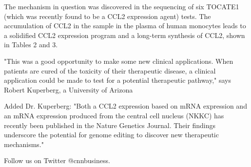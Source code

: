 \documentclass{article}
\begin{document}
The mechanism in question was discovered in the sequencing of six TOCATE1 (which was recently found to be a CCL2 expression agent) tests. The accumulation of CCL2 in the sample in the plasma of human monocytes leads to a solidified CCL2 expression program and a long-term synthesis of CCL2, shown in Tables 2 and 3.

"This was a good opportunity to make some new clinical applications. When patients are cured of the toxicity of their therapeutic disease, a clinical application could be made to test for a potential therapeutic pathway," says Robert Kuperberg, a University of Arizona

Added Dr. Kuperberg: "Both a CCL2 expression based on mRNA expression and an mRNA expression produced from the central cell nucleus (NKKC) has recently been published in the Nature Genetics Journal. Their findings underscore the potential for genome editing to discover new therapeutic mechanisms."

Follow us on Twitter @cnnbusiness.
\end{document}
